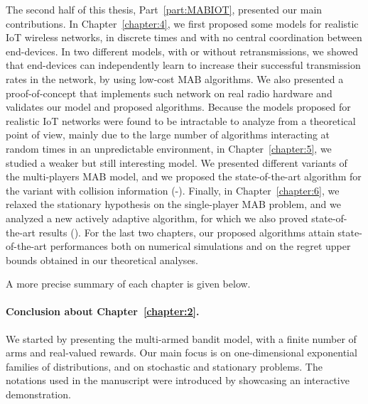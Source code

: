 The second half of this thesis, Part~\ref{part:MABIOT}, presented our main contributions.
In Chapter~\ref{chapter:4}, we first proposed some models for realistic IoT wireless networks, in discrete times and with no central coordination between end-devices.
In two different models, with or without retransmissions, we showed that end-devices can independently learn to increase their successful transmission rates in the network, by using low-cost MAB algorithms.
We also presented a proof-of-concept that implements such network on real radio hardware and validates our model and proposed algorithms.
Because the models proposed for realistic IoT networks were found to be intractable to analyze from a theoretical point of view, mainly due to the large number of algorithms interacting at random times in an unpredictable environment,
in Chapter~\ref{chapter:5}, we studied a weaker but still interesting model.
We presented different variants of the multi-players MAB model, and we proposed the state-of-the-art algorithm for the variant with collision information (\MCTopM-\klUCB).
Finally, in Chapter~\ref{chapter:6}, we relaxed the stationary hypothesis on the single-player MAB problem, and we analyzed a new actively adaptive algorithm, for which we also proved state-of-the-art results (\GLRklUCB).
%
For the last two chapters, our proposed algorithms attain state-of-the-art performances both on numerical simulations and on the regret upper bounds obtained in our theoretical analyses.

A more precise summary of each chapter is given below.




\paragraph{Conclusion about \textbf{Chapter~\ref{chapter:2}}.}

We started by presenting the multi-armed bandit model, with a finite number of arms and real-valued rewards.
Our main focus is on one-dimensional exponential families of distributions, and on stochastic and stationary problems.
The notations used in the manuscript were introduced by showcasing an interactive demonstration.


